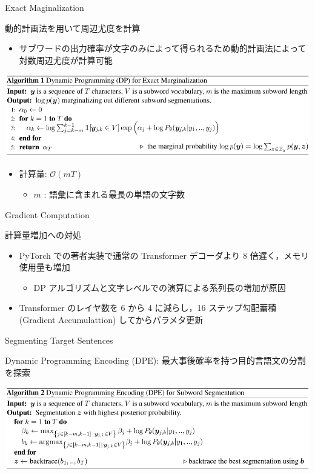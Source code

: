 \documentclass[unicode, 12pt, aspectratio=43]{beamer}
\begin{document}
\begin{frame}[label={sec:orgbdc0c95}]{Exact Maginalization}
\begin{block}{動的計画法を用いて周辺尤度を計算}
\begin{itemize}
\item サブワードの出力確率が文字のみによって得られるため動的計画法によって対数周辺尤度が計算可能
\end{itemize}
\begin{center}
\includegraphics[width=\linewidth]{./figure/Algorithm1.pdf}
\end{center}
\begin{itemize}
\item 計算量:  \(\mathcal{O}(mT)\)
\begin{itemize}
\item \(m\) : 語彙に含まれる最長の単語の文字数
\end{itemize}
\end{itemize}
\end{block}
\end{frame}

\begin{frame}[label={sec:org8b42862}]{Gradient Computation}
\begin{block}{計算量増加への対処}
\begin{itemize}
\item PyTorch での著者実装で通常の Transformer デコーダより 8 倍遅く，メモリ使用量も増加
\begin{itemize}
\item DP アルゴリズムと文字レベルでの演算による系列長の増加が原因
\end{itemize}
\item Transformer のレイヤ数を 6 から 4 に減らし，16 ステップ勾配蓄積 (Gradient Accumulattion) してからパラメタ更新
\end{itemize}
\end{block}
\end{frame}

\begin{frame}[label={sec:org5832acd}]{Segmenting Target Sentences}
\begin{block}{Dynamic Programming Encoding (DPE): 最大事後確率を持つ目的言語文の分割を探索}
\begin{center}
\includegraphics[width=\linewidth]{./figure/Algorithm2.pdf}
\end{center}
\end{block}
\end{frame}
\end{document}
